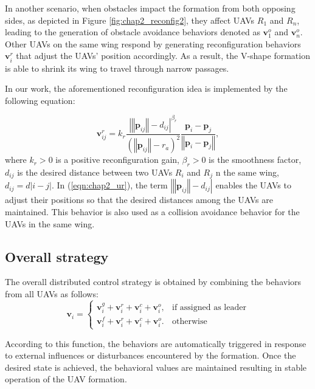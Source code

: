 In another scenario, when obstacles impact the formation from both opposing sides, as depicted in Figure \ref{fig:chap2_reconfig2}, they affect UAVs $R_1$ and $R_n$, leading to the generation of obstacle avoidance behaviors denoted as $\mathbf{v}_1^o$ and $\mathbf{v}_n^o$. Other UAVs on the same wing respond by generating reconfiguration behaviors $\mathbf{v}_i^r$ that adjust the UAVs' position accordingly. As a result, the V-shape formation is able to shrink its wing to travel through narrow passages.

In our work, the aforementioned reconfiguration idea is implemented by the following equation:

\begin{equation}
    \mathbf{v}_{ij}^{r}=k_{r}\dfrac{\left|\left\Vert \mathbf{p}_{ij}\right\Vert -d_{ij}\right|^{\beta_r}}{\left(\left\Vert \mathbf{p}_{ij}\right\Vert -r_{a}\right)^{2}}\dfrac{\mathbf{p}_i-\mathbf{p}_j}{\left\Vert \mathbf{p}_i-\mathbf{p}_j\right\Vert},
    \label{eqn:chap2_ur}
\end{equation}
where $k_r>0$ is a positive reconfiguration gain, $\beta_r>0$ is the smoothness factor, $d_{ij}$ is the desired distance between two UAVs $R_i$ and $R_j$ n the same wing, $d_{ij}=d\left\vert i-j\right\vert$. In (\ref{eqn:chap2_ur}), the term $\left|\left\Vert \mathbf{p}_{ij}\right\Vert -d_{ij}\right|$ enables the UAVs to adjust their positions so that the desired distances among the UAVs are maintained. This behavior is also used as a collision avoidance behavior for the UAVs in the same wing.

\subsection{Overall strategy}
The overall distributed control strategy is obtained by combining the behaviors from all UAVs as follows:
\begin{equation}
    \mathbf{v}_{i}=\left\{ \begin{array}{cc}
\mathbf{v}_{i}^{g}+\mathbf{v}_{i}^{r}+\mathbf{v}_{i}^{c}+\mathbf{v}_{i}^{o}, & \text{if assigned as leader}\\
\mathbf{v}_{i}^{f}+\mathbf{v}_{i}^{r}+\mathbf{v}_{i}^{c}+\mathbf{v}_{i}^{o}. & \text{otherwise}
\end{array}\right.
\end{equation}

According to this function, the behaviors are automatically triggered in response to external influences or disturbances encountered by the formation. Once the desired state is achieved, the behavioral values are maintained resulting in stable operation of the UAV formation.